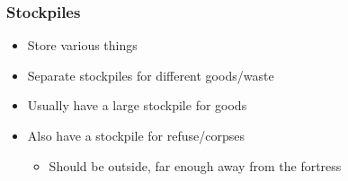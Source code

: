 \begin{frame}
\frametitle{Stockpiles}
\begin{itemize}
\item Store various things
\item Separate stockpiles for different goods/waste
\item Usually have a large stockpile for goods
\item Also have a stockpile for refuse/corpses
\begin{itemize}
	\item Should be outside, far enough away from the fortress
\end{itemize}
\end{itemize}
\end{frame}
